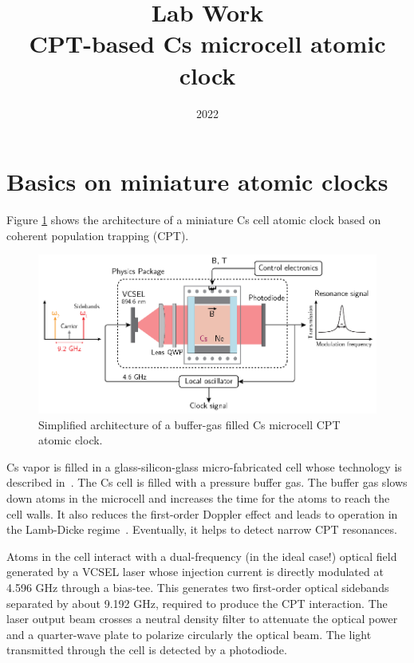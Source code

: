 \documentclass[a4paper,11pt]{article}
\title{Lab Work \\ CPT-based Cs microcell atomic clock}
\author{}
\date{2022}
\begin{document}
\maketitle

\tableofcontents 

\section{Basics on miniature atomic clocks}
Figure \ref{fig:globalcpt} shows the architecture of a miniature Cs cell atomic clock based on coherent population trapping (CPT).

\begin{figure}[h!]
	\centering
	\includegraphics[width=0.7\linewidth]{globalCPT}
	\caption{Simplified architecture of a buffer-gas filled Cs microcell CPT atomic clock.}
	\label{fig:globalcpt}
\end{figure}

Cs vapor is filled in a glass-silicon-glass micro-fabricated cell whose technology is described in~\cite{hasegawa}. The Cs cell is filled with a pressure buffer gas. The buffer gas slows down atoms in the microcell and increases the time for the atoms to reach the cell walls. It also reduces the first-order Doppler effect and leads to operation in the Lamb-Dicke regime~\cite{dicke}. Eventually, it helps to detect narrow CPT resonances.

Atoms in the cell interact with a dual-frequency (in the ideal case!) optical field generated by a VCSEL laser whose injection current is directly modulated at 4.596 GHz through a bias-tee. This generates two first-order optical sidebands separated by about 9.192 GHz, required to produce the CPT interaction. The laser output beam crosses a neutral density filter to attenuate the optical power and a quarter-wave plate to polarize circularly the optical beam. The light transmitted through the cell is detected by a photodiode.
\end{document}
